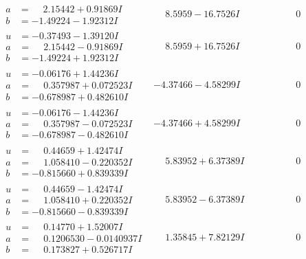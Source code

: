 \documentclass[1p]{elsarticle_modified}
\theoremstyle{definition}
\begin{document}
$$\begin{array}{c|c|c}
\begin{aligned}
a &= \phantom{-}2.15442 + 0.91869 I \\
b &= -1.49224 - 1.92312 I\end{aligned}
 & \phantom{-}8.5959 - 16.7526 I & \phantom{-0.000000 } 0 \\ \hline\begin{aligned}
u &= -0.37493 - 1.39120 I \\
a &= \phantom{-}2.15442 - 0.91869 I \\
b &= -1.49224 + 1.92312 I\end{aligned}
 & \phantom{-}8.5959 + 16.7526 I & \phantom{-0.000000 } 0 \\ \hline\begin{aligned}
u &= -0.06176 + 1.44236 I \\
a &= \phantom{-}0.357987 + 0.072523 I \\
b &= -0.678987 + 0.482610 I\end{aligned}
 & -4.37466 - 4.58299 I & \phantom{-0.000000 } 0 \\ \hline\begin{aligned}
u &= -0.06176 - 1.44236 I \\
a &= \phantom{-}0.357987 - 0.072523 I \\
b &= -0.678987 - 0.482610 I\end{aligned}
 & -4.37466 + 4.58299 I & \phantom{-0.000000 } 0 \\ \hline\begin{aligned}
u &= \phantom{-}0.44659 + 1.42474 I \\
a &= \phantom{-}1.058410 - 0.220352 I \\
b &= -0.815660 + 0.839339 I\end{aligned}
 & \phantom{-}5.83952 + 6.37389 I & \phantom{-0.000000 } 0 \\ \hline\begin{aligned}
u &= \phantom{-}0.44659 - 1.42474 I \\
a &= \phantom{-}1.058410 + 0.220352 I \\
b &= -0.815660 - 0.839339 I\end{aligned}
 & \phantom{-}5.83952 - 6.37389 I & \phantom{-0.000000 } 0 \\ \hline\begin{aligned}
u &= \phantom{-}0.14770 + 1.52007 I \\
a &= \phantom{-}0.1206530 - 0.0140937 I \\
b &= \phantom{-}0.173827 + 0.526717 I\end{aligned}
 & \phantom{-}1.35845 + 7.82129 I & \phantom{-0.000000 } 0 \\ \hline\begin{aligned}

\end{aligned}
\end{array}$$
\end{document}

